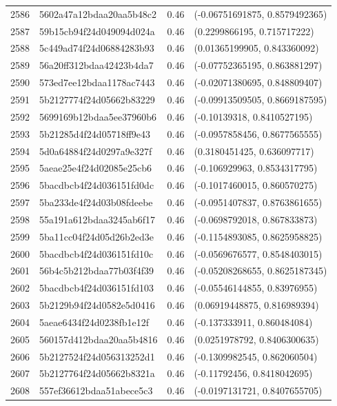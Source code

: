 \begin{table}[ht]
\begin{tabular}{rlrl}
  2586 & 5602a47a12bdaa20aa5b48c2 & 0.46 & (-0.06751691875, 0.8579492365) \\ 
  2587 & 59b15cb94f24d049094d024a & 0.46 & (0.2299866195, 0.715717222) \\ 
  2588 & 5c449ad74f24d06884283b93 & 0.46 & (0.01365199905, 0.843360092) \\ 
  2589 & 56a20ff312bdaa42423b4da7 & 0.46 & (-0.07752365195, 0.863881297) \\ 
  2590 & 573ed7ee12bdaa1178ac7443 & 0.46 & (-0.02071380695, 0.848809407) \\ 
  2591 & 5b2127774f24d05662b83229 & 0.46 & (-0.09913509505, 0.8669187595) \\ 
  2592 & 5699169b12bdaa5ee37960b6 & 0.46 & (-0.10139318, 0.8410527195) \\ 
  2593 & 5b21285d4f24d05718ff9e43 & 0.46 & (-0.0957858456, 0.8677565555) \\ 
  2594 & 5d0a64884f24d0297a9e327f & 0.46 & (0.3180451425, 0.636097717) \\ 
  2595 & 5aeae25e4f24d02085e25cb6 & 0.46 & (-0.106929963, 0.8534317795) \\ 
  2596 & 5bacdbcb4f24d036151fd0dc & 0.46 & (-0.1017460015, 0.860570275) \\ 
  2597 & 5ba233de4f24d03b08fdeebe & 0.46 & (-0.0951407837, 0.8763861655) \\ 
  2598 & 55a191a612bdaa3245ab6f17 & 0.46 & (-0.0698792018, 0.867833873) \\ 
  2599 & 5ba11cc04f24d05d26b2ed3e & 0.46 & (-0.1154893085, 0.8625958825) \\ 
  2600 & 5bacdbcb4f24d036151fd10c & 0.46 & (-0.0569676577, 0.8548403015) \\ 
  2601 & 56b4c5b212bdaa77b03f4f39 & 0.46 & (-0.05208268655, 0.8625187345) \\ 
  2602 & 5bacdbcb4f24d036151fd103 & 0.46 & (-0.05546144855, 0.83976955) \\ 
  2603 & 5b2129b94f24d0582e5d0416 & 0.46 & (0.06919448875, 0.816989394) \\ 
  2604 & 5aeae6434f24d0238fb1e12f & 0.46 & (-0.137333911, 0.860484084) \\ 
  2605 & 560157d412bdaa20aa5b4816 & 0.46 & (0.0251978792, 0.8406300635) \\ 
  2606 & 5b2127524f24d056313252d1 & 0.46 & (-0.1309982545, 0.862060504) \\ 
  2607 & 5b2127764f24d05662b8321a & 0.46 & (-0.11792456, 0.8418042695) \\ 
  2608 & 557ef36612bdaa51abece5c3 & 0.46 & (-0.0197131721, 0.8407655705) \\ 

\end{tabular}
\end{table}

